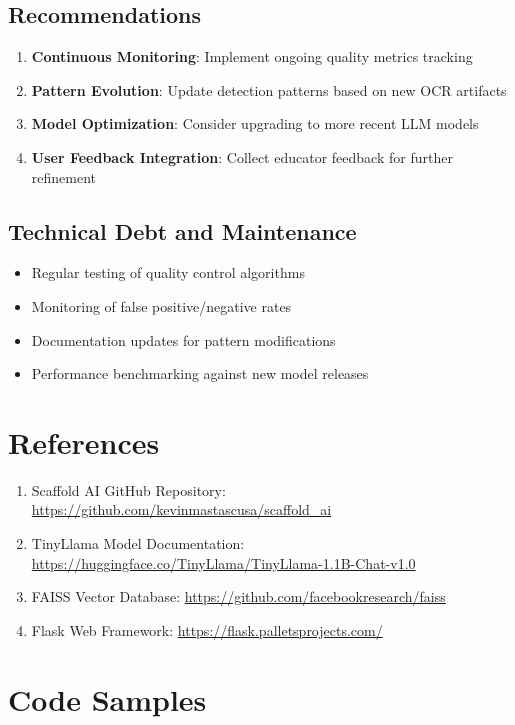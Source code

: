 \documentclass[12pt,a4paper]{article}
\begin{document}
\subsection{Recommendations}
\begin{enumerate}
    \item \textbf{Continuous Monitoring}: Implement ongoing quality metrics tracking
    \item \textbf{Pattern Evolution}: Update detection patterns based on new OCR artifacts
    \item \textbf{Model Optimization}: Consider upgrading to more recent LLM models
    \item \textbf{User Feedback Integration}: Collect educator feedback for further refinement
\end{enumerate}

\subsection{Technical Debt and Maintenance}
\begin{itemize}
    \item Regular testing of quality control algorithms
    \item Monitoring of false positive/negative rates
    \item Documentation updates for pattern modifications
    \item Performance benchmarking against new model releases
\end{itemize}

\section{References}

\begin{enumerate}
    \item Scaffold AI GitHub Repository: \url{https://github.com/kevinmastascusa/scaffold_ai}
    \item TinyLlama Model Documentation: \url{https://huggingface.co/TinyLlama/TinyLlama-1.1B-Chat-v1.0}
    \item FAISS Vector Database: \url{https://github.com/facebookresearch/faiss}
    \item Flask Web Framework: \url{https://flask.palletsprojects.com/}
\end{enumerate}

\appendix

\section{Code Samples}
\end{document}
